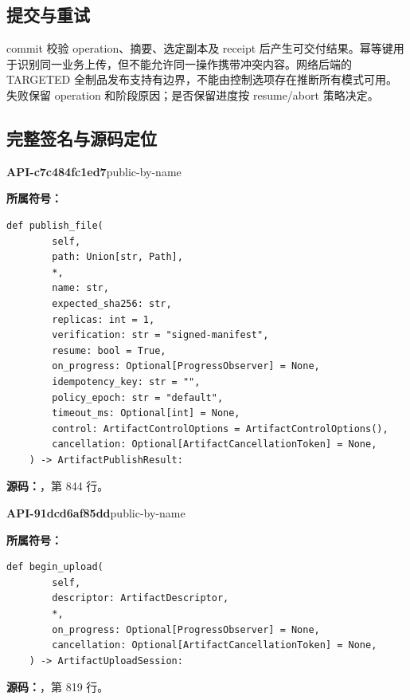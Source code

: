 \subsection{提交与重试}
commit 校验 operation、摘要、选定副本及 receipt 后产生可交付结果。幂等键用于识别同一业务上传，但不能允许同一操作携带冲突内容。网络后端的 TARGETED 全制品发布支持有边界，不能由控制选项存在推断所有模式可用。失败保留 operation 和阶段原因；是否保留进度按 resume/abort 策略决定。

\subsection{完整签名与源码定位}

\textbf{API-c7c484fc1ed7}\quad public-by-name\par
\textbf{所属符号：}\par
\begin{Verbatim}[fontsize=\footnotesize,breaklines,breakanywhere]
def publish_file(
        self,
        path: Union[str, Path],
        *,
        name: str,
        expected_sha256: str,
        replicas: int = 1,
        verification: str = "signed-manifest",
        resume: bool = True,
        on_progress: Optional[ProgressObserver] = None,
        idempotency_key: str = "",
        policy_epoch: str = "default",
        timeout_ms: Optional[int] = None,
        control: ArtifactControlOptions = ArtifactControlOptions(),
        cancellation: Optional[ArtifactCancellationToken] = None,
    ) -> ArtifactPublishResult:
\end{Verbatim}
\textbf{源码：}，第 844 行。\par

\textbf{API-91dcd6af85dd}\quad public-by-name\par
\textbf{所属符号：}\par
\begin{Verbatim}[fontsize=\footnotesize,breaklines,breakanywhere]
def begin_upload(
        self,
        descriptor: ArtifactDescriptor,
        *,
        on_progress: Optional[ProgressObserver] = None,
        cancellation: Optional[ArtifactCancellationToken] = None,
    ) -> ArtifactUploadSession:
\end{Verbatim}
\textbf{源码：}，第 819 行。\par

